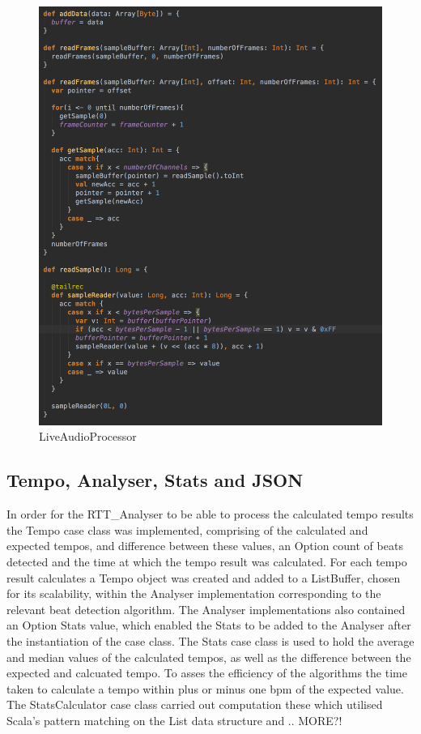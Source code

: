 \documentclass[a4paper, 11pt]{article}
\begin{document}
\begin{figure}[ht]
	\centering
	\includegraphics[scale=0.25]{images/liveAudioPro.jpg}
	\caption{LiveAudioProcessor}
	\label{fig: liveAudPro}
\end{figure}

\subsection{Tempo, Analyser, Stats and JSON}
In order for the RTT\_Analyser to be able to process the calculated tempo results the Tempo case class was implemented, comprising of the calculated and expected tempos, and difference between these values, an Option count of beats detected and the time at which the tempo result was calculated. For each tempo result calculates a Tempo object was created and added to a ListBuffer, chosen for its scalability,  within the Analyser implementation corresponding to the relevant beat detection algorithm. The Analyser implementations also contained an Option Stats value, which enabled the Stats to be added to the Analyser after the instantiation of the case class. The Stats case class is used to hold the average and median values of the calculated tempos, as well as the difference between the expected and calcuated tempo. To asses the efficiency of the algorithms the time taken to calculate a tempo within plus or minus one bpm of the expected value. The StatsCalculator case class carried out computation  these which utilised Scala's pattern matching on the List data structure and .. MORE?!
\end{document}
